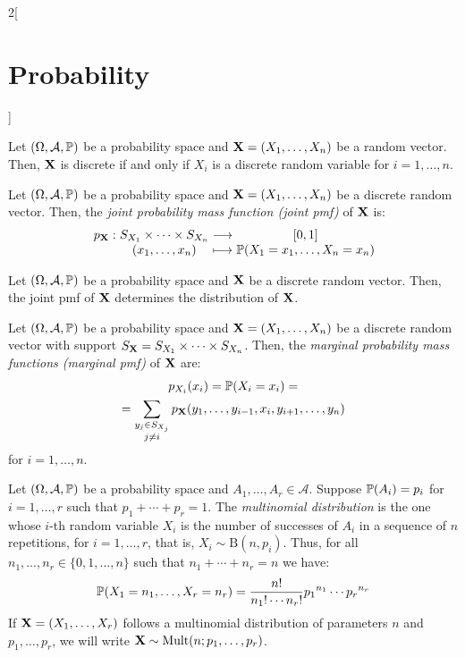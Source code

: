 \documentclass[../../../main.tex]{subfiles}
\begin{document}
\begin{multicols}{2}[\section{Probability}]
\begin{prop}
        Let $(\Omega,\mathcal{A},\mathbb{P})$ be a probability space and $\boldsymbol{\mathrm{X}}=(X_1,\ldots,X_n)$ be a random vector. Then, $\boldsymbol{\mathrm{X}}$ is discrete if and only if $X_i$ is a discrete random variable for $i=1,\ldots,n$.
    \end{prop}
    \begin{definition}
        Let $(\Omega,\mathcal{A},\mathbb{P})$ be a probability space and $\boldsymbol{\mathrm{X}}=(X_1,\ldots,X_n)$ be a discrete random vector. Then, the \textit{joint probability mass function (joint pmf)} of $\boldsymbol{\mathrm{X}}$ is:
        $$
            \function{p_{\vf{X}}}{S_{X_1}\times\cdots\times S_{X_n}}{[0,1]}{(x_1,\ldots,x_n)}{\Prob(X_1=x_1,\ldots,X_n=x_n)}
        $$
    \end{definition}
    \begin{prop}
        Let $(\Omega,\mathcal{A},\mathbb{P})$ be a probability space and $\boldsymbol{\mathrm{X}}$ be a discrete random vector. Then, the joint pmf of $\boldsymbol{\mathrm{X}}$ determines the distribution of $\boldsymbol{\mathrm{X}}$.
    \end{prop}
    \begin{definition}
        Let $(\Omega,\mathcal{A},\mathbb{P})$ be a probability space and $\boldsymbol{\mathrm{X}}=(X_1,\ldots,X_n)$ be a discrete random vector with support $S_{\boldsymbol{\mathrm{X}}}=S_{X_1}\times\cdots\times S_{X_n}$. Then, the \textit{marginal probability mass functions (marginal pmf)} of $\boldsymbol{\mathrm{X}}$ are:
        \begin{multline*}
            p_{X_i}(x_i)=\mathbb{P}(X_i=x_i)=\\=\sum_{\substack{y_j\in S_{X_j}\\j\ne i}}p_{\boldsymbol{\mathrm{X}}}(y_1,\ldots,y_{i-1},x_i,y_{i+1},\ldots,y_n)
        \end{multline*}
        for $i=1,\ldots,n$.
    \end{definition}
    \begin{definition}
        Let $(\Omega,\mathcal{A},\mathbb{P})$ be a probability space and $A_1,\ldots,A_r\in\mathcal{A}$. Suppose $\mathbb{P}(A_i)=p_i$ for $i=1,\ldots,r$ such that $p_1+\cdots+p_r=1$. The \textit{multinomial distribution} is the one whose $i$-th random variable $X_i$ is the number of successes of $A_i$ in a sequence of $n$ repetitions, for $i=1,\ldots,r$, that is, $X_i\sim\text{B}(n,p_i)$. Thus, for all $n_1,\ldots,n_r\in\{0,1,\ldots,n\}$ such that $n_1+\cdots+n_r=n$ we have: $$\mathbb{P}(X_1=n_1,\ldots,X_r=n_r)=\frac{n!}{n_1!\cdots n_r!} {p_1}^{n_1}\cdots{p_r}^{n_r}$$ If $\boldsymbol{\mathrm{X}}=(X_1,\ldots,X_r)$ follows a multinomial distribution of parameters $n$ and $p_1,\ldots,p_r$, we will write $\boldsymbol{\mathrm{X}}\sim \text{Mult}(n;p_1,\ldots,p_r)$.

\end{definition}
\end{multicols}
\end{document}
